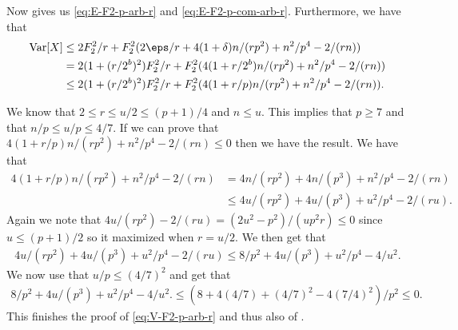 Now  gives us \eqref{eq:E-F2-p-arb-r}
and \eqref{eq:E-F2-p-com-arb-r}. Furthermore, we have that
\begin{align*}
    \Var[X] 
        &\le 2F_2^2/r + F_2^2 (2\eps/r + 4(1 + \delta)n / (rp^2) + n^2/p^4 - 2 /(rn))
        \\&= 2(1 + (r/2^b)^2)F_2^2/r + F_2^2(4(1 + r/2^b)n/(r p^2) + n^2/p^4 - 2/(rn)) 
        \\&\le 2(1 + (r/2^b)^2)F_2^2/r + F_2^2(4(1 + r/p)n/(r p^2) + n^2/p^4 - 2/(rn)) .
\end{align*}

We know that $2 \le r \le u/2 \le (p + 1)/4$ and $n \le u$.
This implies that $p \ge 7$ and that $n/p \le u/p \le 4/7$.
If we can prove that $4(1 + r/p)n / (rp^2) + n^2/p^4 - 2 / (rn) \le 0$ then
we have the result. We have that
\begin{align*}
   4(1 + r/p)n / (rp^2) + n^2/p^4 - 2 / (rn)
      &= 4 n/(rp^2) + 4 n /(p^3) + n^2/p^4 - 2/(rn)
      \\&\le 4u/(rp^2) + 4u/(p^3) + u^2/p^4 - 2/(ru) .
\end{align*}
Again we note that $4u/(r p^2) - 2/(ru) = (2u^2 - p^2)/(u p^2 r) \le 0$
since $u \le (p + 1)/2$ so it maximized when $r = u/2$. We then get
that
\begin{align*}
   4u/(r p^2) + 4u/(p^3) + u^2/p^4 - 2/(ru)
      \le 8/p^2 + 4u/(p^3) + u^2/p^4 - 4/u^2 .
\end{align*}
We now use that $u/p \le (4/7)^2$ and get that
\begin{align*}
   8/p^2 + 4u/(p^3) + u^2/p^4 - 4/u^2 .
      \le (8 + 4 (4/7) + (4/7)^2 - 4 (7/4)^2)/p^2
      \le 0 .
\end{align*}
This finishes the proof of \eqref{eq:V-F2-p-arb-r} and thus also of .

